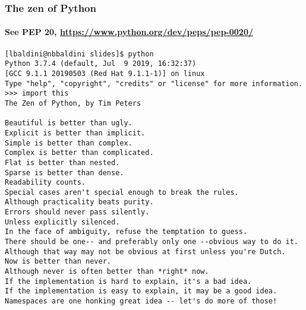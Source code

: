 \documentclass[9pt]{beamer}
\begin{document}
\begin{frame}[fragile]
  \frametitle{The zen of Python}
  \framesubtitle{See PEP 20, \url{https://www.python.org/dev/peps/pep-0020/}}
  \begin{Verbatim}
[lbaldini@nbbaldini slides]$ python
Python 3.7.4 (default, Jul  9 2019, 16:32:37)
[GCC 9.1.1 20190503 (Red Hat 9.1.1-1)] on linux
Type "help", "copyright", "credits" or "license" for more information.
>>> import this
The Zen of Python, by Tim Peters

Beautiful is better than ugly.
Explicit is better than implicit.
Simple is better than complex.
Complex is better than complicated.
Flat is better than nested.
Sparse is better than dense.
Readability counts.
Special cases aren't special enough to break the rules.
Although practicality beats purity.
Errors should never pass silently.
Unless explicitly silenced.
In the face of ambiguity, refuse the temptation to guess.
There should be one-- and preferably only one --obvious way to do it.
Although that way may not be obvious at first unless you're Dutch.
Now is better than never.
Although never is often better than *right* now.
If the implementation is hard to explain, it's a bad idea.
If the implementation is easy to explain, it may be a good idea.
Namespaces are one honking great idea -- let's do more of those!
  \end{Verbatim}
\end{frame}
\end{document}
